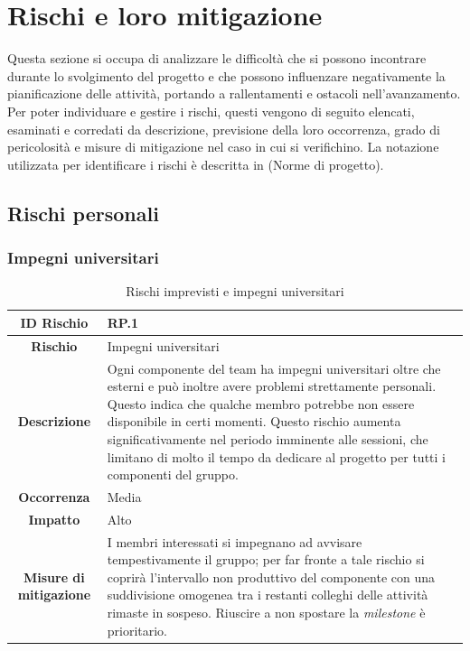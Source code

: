 \documentclass[10pt, a4paper]{article}
\begin{document}
\newpage

\section{Rischi e loro mitigazione}
\label{section:Rischi}
Questa sezione si occupa di analizzare le difficoltà che si possono incontrare durante lo svolgimento del progetto e che possono influenzare negativamente la pianificazione delle attività, portando a rallentamenti e ostacoli nell'avanzamento.\\
Per poter individuare e gestire i rischi, questi vengono di seguito elencati, esaminati e corredati da descrizione, previsione della loro occorrenza, grado di pericolosità e misure di mitigazione nel caso in cui si verifichino.
La notazione utilizzata per identificare i rischi è descritta in (Norme di progetto).

\subsection{Rischi personali}


\subsubsection{Impegni universitari}
{\renewcommand{\arraystretch}{1.5}
\begin{table}[H]
\begin{tabularx}{\textwidth}{c|X}
\textbf{ID Rischio} & RP.1 \\
\hline
\textbf{Rischio} & Impegni universitari\\
\hline
\textbf{Descrizione} & Ogni componente del team ha impegni universitari oltre che esterni e può inoltre avere problemi strettamente personali. Questo indica che qualche membro potrebbe non essere disponibile in certi momenti. Questo rischio aumenta significativamente nel periodo imminente alle sessioni, che limitano di molto il tempo da dedicare al progetto per tutti i componenti del gruppo. \\
\hline
\textbf{Occorrenza} & Media\\
\hline
\textbf{Impatto} & Alto\\
\hline
\textbf{Misure di mitigazione} & I membri interessati si impegnano ad avvisare tempestivamente il gruppo; per far fronte a tale rischio si coprirà l’intervallo non produttivo del componente con una suddivisione omogenea tra i restanti colleghi delle attività rimaste in sospeso.
Riuscire a non spostare la \textit{milestone} è prioritario.\\
\end{tabularx}
\caption{Rischi imprevisti e impegni universitari}
\end{table}}
\end{document}
